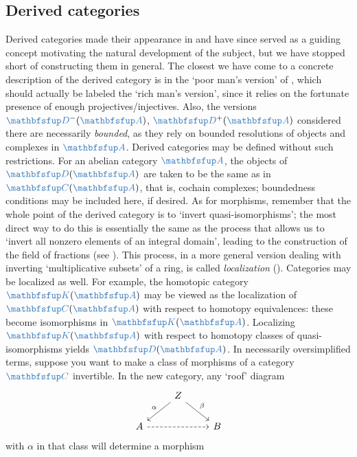 \subsection{Derived categories}
\label{subsec:homol:derived-categories}
Derived categories made their appearance in
 and
have since served as a guiding concept motivating the natural
development of the subject, but we have stopped short of constructing
them in general. The closest we have come to a concrete description of
the derived category is in the `poor man's version' of
, which should
actually be labeled the `rich man's version', since it relies on the
fortunate presence of enough projectives/injectives. Also, the
versions $\categ{D}^-(\categ{A})$, $\categ{D}^+(\categ{A})$ considered
there are necessarily \emph{bounded}, as they rely on bounded
resolutions of objects and complexes in $\categ{A}$.  Derived
categories may be defined without such restrictions. For an abelian
category $\categ{A}$, the objects of $\categ{D}(\categ{A})$ are taken
to be the same as in $\categ{C}(\categ{A})$, that is, cochain
complexes; boundedness conditions may be included here, if desired. As
for morphisms, remember that the whole point of the derived category
is to `invert quasi-isomorphisms'; the most direct way to do this is
essentially the same as the process that allows us to `invert all
nonzero elements of an integral domain', leading to the construction
of the field of fractions (see
). This
process, in a more general version dealing with inverting
`multiplicative subsets' of a ring, is called \emph{localization}
(). Categories may be
localized as well. For example, the homotopic category
$\categ{K}(\categ{A})$ may be viewed as the localization of
$\categ{C}(\categ{A})$ with respect to homotopy equivalences: these
become isomorphisms in $\categ{K}(\categ{A})$.  Localizing
$\categ{K}(\categ{A})$ with respect to homotopy classes of
quasi-isomorphisms yields $\categ{D}(\categ{A})$.  In necessarily
oversimplified terms, suppose you want to make a class of morphisms of
a category $\categ{C}$ invertible. In the new category, any `roof'
diagram
\[\begin{tikzcd}
    & Z \arrow[dl,"\alpha"'] \arrow[dr,"\beta"] & \\
    A \arrow[rr,dashed] & & B
  \end{tikzcd}\] with $\alpha$ in that class will determine a morphism
